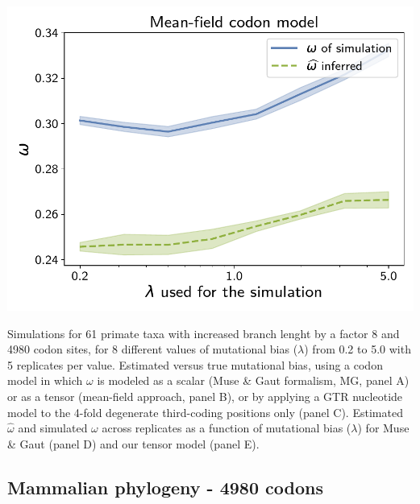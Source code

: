 \documentclass{article}
\begin{document}
\begin{center}
\begin{minipage}{0.325\linewidth}
        \includegraphics[width=\linewidth, page=1]{inference_supp_mat/PrimatesExons10Mu8.0_omega_MF.pdf}
    \end{minipage}
\end{center}
Simulations for 61 primate taxa with increased branch lenght by a factor 8 and 4980 codon sites, for 8 different values of mutational bias ($\lambda$) from 0.2 to 5.0 with 5 replicates per value.
Estimated versus true mutational bias, using a codon model in which $\omega$ is modeled as a scalar (Muse \& Gaut formalism, MG, panel A) or as a tensor (mean-field approach, panel B), or by applying a GTR nucleotide model to the 4-fold degenerate third-coding positions only (panel C).
Estimated $\hat{\omega}$ and simulated $\omega$ across replicates as a function of mutational bias ($\lambda$) for Muse \& Gaut (panel D) and our tensor model (panel E).

\subsection{Mammalian phylogeny - 4980 codons}
\end{document}
